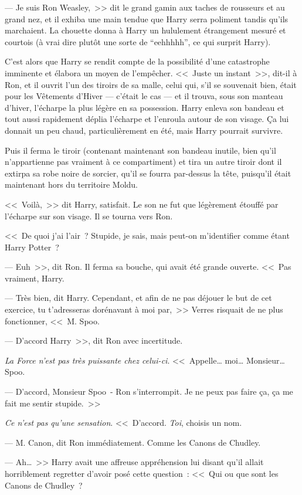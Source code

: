 --- Je suis Ron Weasley,~>> dit le grand gamin aux taches de rousseurs et au grand nez, et il exhiba une main tendue que Harry serra poliment tandis qu'ils marchaient. La chouette donna à Harry un hululement étrangement mesuré et courtois (à vrai dire plutôt une sorte de “eehhhhh”, ce qui surprit Harry).

C'est alors que Harry se rendit compte de la possibilité d'une catastrophe imminente et élabora un moyen de l'empêcher. <<~Juste un instant~>>, dit-il à Ron, et il ouvrit l'un des tiroirs de sa malle, celui qui, s'il se souvenait bien, était pour les Vêtements d'Hiver — c'était le cas — et il trouva, sous son manteau d'hiver, l'écharpe la plus légère en sa possession. Harry enleva son bandeau et tout aussi rapidement déplia l'écharpe et l'enroula autour de son visage. Ça lui donnait un peu chaud, particulièrement en été, mais Harry pourrait survivre.

Puis il ferma le tiroir (contenant maintenant son bandeau inutile, bien qu'il n'appartienne pas vraiment à ce compartiment) et tira un autre tiroir dont il extirpa sa robe noire de sorcier, qu'il se fourra par-dessus la tête, puisqu'il était maintenant hors du territoire Moldu.

<<~Voilà,~>> dit Harry, satisfait. Le son ne fut que légèrement étouffé par l'écharpe sur son visage. Il se tourna vers Ron.

<<~De quoi j'ai l'air~? Stupide, je sais, mais peut-on m'identifier comme étant Harry Potter~?

--- Euh~>>, dit Ron. Il ferma sa bouche, qui avait été grande ouverte. <<~Pas vraiment, Harry.

--- Très bien, dit Harry. Cependant, et afin de ne pas déjouer le but de cet exercice, tu t'adresseras dorénavant à moi par,~>> Verres risquait de ne plus fonctionner, <<~M. Spoo.

--- D'accord Harry~>>, dit Ron avec incertitude.

\emph{La Force n'est pas très puissante chez celui-ci}. <<~Appelle… moi… Monsieur… Spoo.

--- D'accord, Monsieur Spoo~- Ron s'interrompit. Je ne peux pas faire ça, ça me fait me sentir stupide.~>>

\emph{Ce n'est pas qu'une sensation}. <<~D'accord. \emph{Toi}, choisis un nom.

--- M. Canon, dit Ron immédiatement. Comme les Canons de Chudley.

--- Ah…~>> Harry avait une affreuse appréhension lui disant qu'il allait horriblement regretter d'avoir posé cette question~: <<~Qui ou que sont les Canons de Chudley~?

